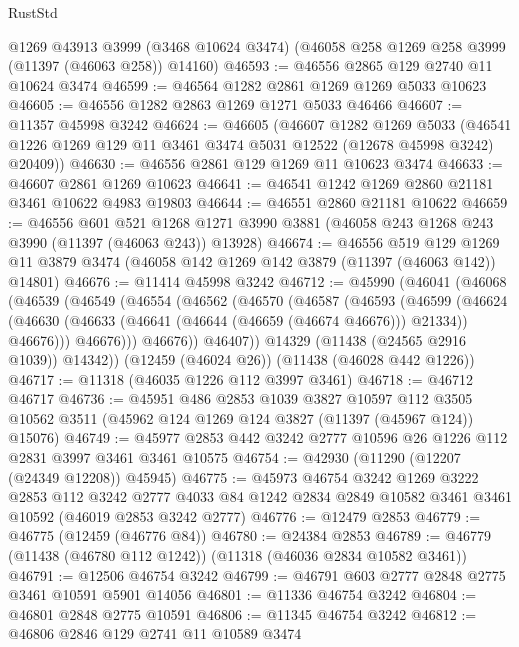 \begin{lexlean}{RustStd}
\begin{coremodule}
    @1269
    @43913
    @3999
    (@3468 @10624 @3474)
    (@46058 @258 @1269 @258 @3999 (@11397 (@46063 @258)) @14160)
@46593 := @46556 @2865 @129 @2740 @11 @10624 @3474
@46599 := @46564 @1282 @2861 @1269 @1269 @5033 @10623
@46605 := @46556 @1282 @2863 @1269 @1271 @5033 @46466
@46607 := @11357 @45998 @3242
@46624 := @46605
    (@46607
      @1282
      @1269
      @5033
      (@46541 @1226 @1269 @129 @11 @3461 @3474 @5031 @12522 (@12678 @45998 @3242) @20409))
@46630 := @46556 @2861 @129 @1269 @11 @10623 @3474
@46633 := @46607 @2861 @1269 @10623
@46641 := @46541 @1242 @1269 @2860 @21181 @3461 @10622 @4983 @19803
@46644 := @46551 @2860 @21181 @10622
@46659 := @46556
    @601
    @521
    @1268
    @1271
    @3990
    @3881
    (@46058 @243 @1268 @243 @3990 (@11397 (@46063 @243)) @13928)
@46674 := @46556
    @519
    @129
    @1269
    @11
    @3879
    @3474
    (@46058 @142 @1269 @142 @3879 (@11397 (@46063 @142)) @14801)
@46676 := @11414 @45998 @3242
@46712 := @45990
    (@46041
      (@46068
        (@46539
          (@46549
            (@46554
              (@46562
                (@46570
                  (@46587
                    (@46593
                      (@46599
                        (@46624
                          (@46630
                            (@46633 (@46641 (@46644 (@46659 (@46674 @46676))) @21334))
                            @46676)))
                      @46676)))
                @46676))
            @46407))
        @14329
        (@11438 (@24565 @2916 @1039))
        @14342))
    (@12459 (@46024 @26))
    (@11438 (@46028 @442 @1226))
@46717 := @11318 (@46035 @1226 @112 @3997 @3461)
@46718 := @46712 @46717
@46736 := @45951
    @486
    @2853
    @1039
    @3827
    @10597
    @112
    @3505
    @10562
    @3511
    (@45962 @124 @1269 @124 @3827 (@11397 (@45967 @124)) @15076)
@46749 := @45977 @2853 @442 @3242 @2777 @10596 @26 @1226 @112 @2831 @3997 @3461 @3461 @10575
@46754 := @42930 (@11290 (@12207 (@24349 @12208)) @45945)
@46775 := @45973
    @46754
    @3242
    @1269
    @3222
    @2853
    @112
    @3242
    @2777
    @4033
    @84
    @1242
    @2834
    @2849
    @10582
    @3461
    @3461
    @10592
    (@46019 @2853 @3242 @2777)
@46776 := @12479 @2853
@46779 := @46775 (@12459 (@46776 @84))
@46780 := @24384 @2853
@46789 := @46779 (@11438 (@46780 @112 @1242)) (@11318 (@46036 @2834 @10582 @3461))
@46791 := @12506 @46754 @3242
@46799 := @46791 @603 @2777 @2848 @2775 @3461 @10591 @5901 @14056
@46801 := @11336 @46754 @3242
@46804 := @46801 @2848 @2775 @10591
@46806 := @11345 @46754 @3242
@46812 := @46806 @2846 @129 @2741 @11 @10589 @3474

\end{coremodule}
\end{lexlean}
